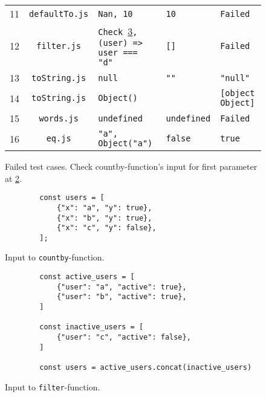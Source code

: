 \documentclass[]{article}
\begin{document}
\begin{figure}[H]
\begin{tabularx}{\textwidth}{c c X X X}
		11 & \texttt{defaultTo.js}  & \texttt{Nan, 10}                                                 & \texttt{10}                       & \texttt{Failed}                              \\
		12 & \texttt{filter.js}     & \texttt{Check \ref{lst:filter-users},  ({user}) => user === "d"} & \texttt{[]}                       & \texttt{Failed}                              \\
		13 & \texttt{toString.js}   & \texttt{null}                                                    & \texttt{""}                       & \texttt{"null"}                              \\
		14 & \texttt{toString.js}   & \texttt{Object()}                                                & \texttt{{}}                       & \texttt{[object Object]}                     \\
		15 & \texttt{words.js}      & \texttt{undefined}                                               & \texttt{undefined}                & \texttt{Failed}                              \\
		16 & \texttt{eq.js}         & \texttt{"a", Object("a")}                                        & \texttt{false}                    & \texttt{true}                                \\
		\bottomrule
	\end{tabularx}
	\caption{Failed test cases. Check countby-function's input for first parameter at \ref{lst:countby-users}.}
	\label{tab:failed_tests}
\end{figure}

\newpage

\begin{figure}[H]
	\centering
	\begin{lstlisting}
		const users = [
			{"x": "a", "y": true},
			{"x": "b", "y": true},
			{"x": "c", "y": false},
		];
	\end{lstlisting}
	\caption{Input to \texttt{countby}-function.}
	\label{lst:countby-users}
\end{figure}

\begin{figure}[H]
	\centering
	\begin{lstlisting}
		const active_users = [
			{"user": "a", "active": true},
			{"user": "b", "active": true},
		]

		const inactive_users = [
			{"user": "c", "active": false},
		]

		const users = active_users.concat(inactive_users)
	\end{lstlisting}
	\caption{Input to \texttt{filter}-function.}
	\label{lst:filter-users}
\end{figure}
\end{document}
